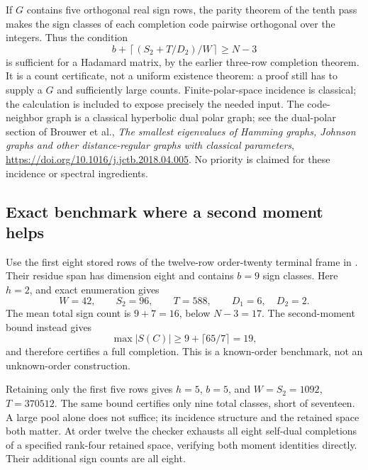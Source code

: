 If $G$ contains five orthogonal real sign rows, the parity theorem
of the tenth pass makes the sign classes of each completion code
pairwise orthogonal over the integers. Thus the condition
\[
 b+\left\lceil(S_2+T/D_2)/W\right\rceil\ge N-3
\]
is sufficient for a Hadamard matrix, by the earlier three-row
completion theorem. It is a count certificate, not a uniform
existence theorem: a proof still has to supply a $G$ and sufficiently
large counts. Finite-polar-space incidence is classical; the
calculation is included to expose precisely the needed input.
The code-neighbor graph is a classical hyperbolic dual polar graph;
see the dual-polar section of Brouwer et al.,
\emph{The smallest eigenvalues of Hamming graphs, Johnson graphs and
other distance-regular graphs with classical parameters},
\url{https://doi.org/10.1016/j.jctb.2018.04.005}.
No priority is claimed for these incidence or spectral ingredients.

\subsection{Exact benchmark where a second moment helps}
Use the first eight stored rows of the twelve-row order-twenty
terminal frame in
. Their residue span has
dimension eight and contains $b=9$ sign classes. Here $h=2$, and
exact enumeration gives
\[
 W=42,\qquad S_2=96,\qquad T=588,\qquad D_1=6,\quad D_2=2.
\]
The mean total sign count is $9+7=16$, below $N-3=17$.
The second-moment bound instead gives
\[
 \max |S(C)|\ge9+\lceil65/7\rceil=19,
\]
and therefore certifies a full completion. This is a known-order
benchmark, not an unknown-order construction.

Retaining only the first five rows gives $h=5$, $b=5$, and
$W=S_2=1092$, $T=370512$. The same bound certifies only nine total
classes, short of seventeen. A large pool alone does not suffice;
its incidence structure and the retained space both matter.
At order twelve the checker exhausts all eight self-dual completions
of a specified rank-four retained space, verifying both moment
identities directly. Their additional sign counts are all eight.

